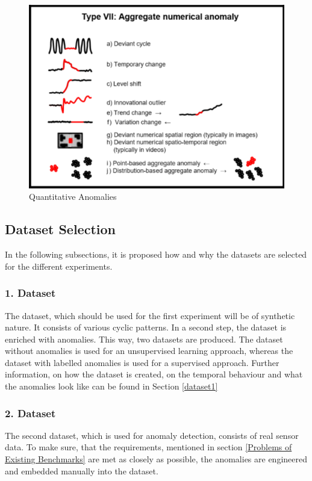 \begin{figure}[h]
	\centering
	\includegraphics[scale=0.6]{Figures/series_anomaly}
	\decoRule
	\caption[Quantitative Anomalies]{Quantitative Anomalies \parencite{Foorthuis2021}}
	\label{fig:Anomaly_types}
\end{figure}

\subsection{Dataset Selection}
In the following subsections, it is proposed how and why the datasets are selected for the different experiments.

\subsubsection{1. Dataset}
The dataset, which should be used for the first experiment will be of synthetic nature. It consists of various cyclic patterns. In a second step, the dataset is enriched with anomalies. This way, two datasets are produced. The dataset without anomalies is used for an unsupervised learning approach, whereas the dataset with labelled anomalies is used for a supervised approach. Further information, on how the dataset is created, on the temporal behaviour and what the anomalies look like can be found in Section \ref{dataset1} 

\subsubsection{2. Dataset}
The second dataset, which is used for anomaly detection, consists of real sensor data. To make sure, that the requirements, mentioned in section \ref{Problems of Existing Benchmarks} are met as closely as possible, the anomalies are engineered and embedded manually into the dataset. 

